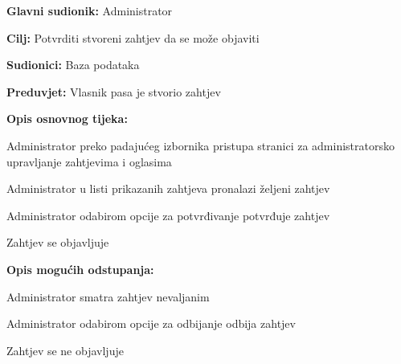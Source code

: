 					\noindent {}
					\begin{packed_item}
						
						\item \textbf{Glavni sudionik: } Administrator
						\item  \textbf{Cilj:} Potvrditi stvoreni zahtjev da se može objaviti
						\item  \textbf{Sudionici:} Baza podataka
						\item  \textbf{Preduvjet:} Vlasnik pasa je stvorio zahtjev
						\item  \textbf{Opis osnovnog tijeka:}
						
						\item[] \begin{packed_enum}
							
							\item Administrator preko padajućeg izbornika pristupa stranici za administratorsko upravljanje zahtjevima i oglasima
							\item Administrator u listi prikazanih zahtjeva pronalazi željeni zahtjev
							\item Administrator odabirom opcije za potvrđivanje potvrđuje zahtjev
							\item Zahtjev se objavljuje
							
						\end{packed_enum}
						\item  \textbf{Opis mogućih odstupanja:}
						
						\item[] \begin{packed_item}
							
							\item[3.a] Administrator smatra zahtjev nevaljanim
							\item[] \begin{packed_enum}
								
								\item Administrator odabirom opcije za odbijanje odbija zahtjev
								\item Zahtjev se ne objavljuje 
								
							\end{packed_enum}
							
						\end{packed_item}
					\end{packed_item}
					
